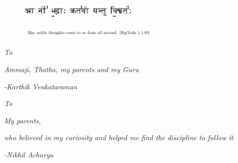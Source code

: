 \begin{figure}
	\vfill
	\begin{center}
		\includegraphics[width=0.5\textwidth]{figures/AaNoBhadrA.jpg}
	\end{center}
	\vfill
	\label{fig:AaNoBhadrA}
\end{figure}

\begin{figure}
	\begin{center}
		\includegraphics[width=0.6\textwidth]{figures/AaNoBhadrAE.png}
	\end{center}
	\label{fig:AaNoBhadrAE}
\end{figure}

\centerline{\textit{To}}
\centerline{\textit{Ammaji, Thatha, my parents and my Guru}}

\centerline{\textit{ }}
\centerline{\textit{ }}

\centerline{\textit{-Karthik Venkataraman}}



\newpage

\centerline{\textit{To}}
\centerline{\textit{My parents,}}
\centerline{\textit{who believed in my curiosity and helped me find the discipline to follow it}} 

\centerline{\textit{ }}
\centerline{\textit{ }}

\centerline{\textit{-Nikhil Acharya}}
